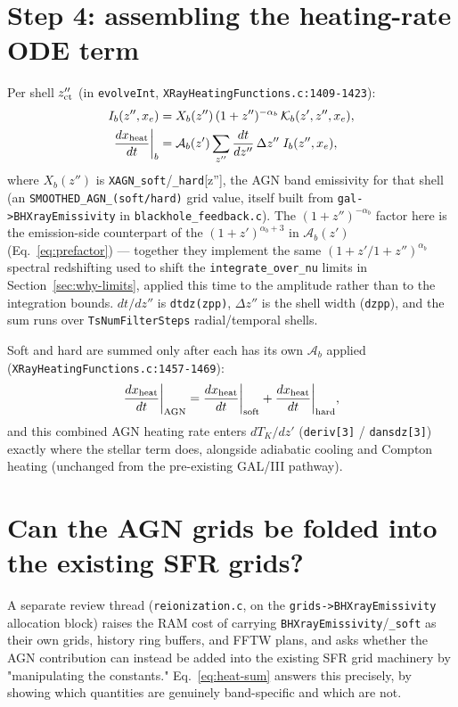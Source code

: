 \documentclass[11pt]{article}
\newcommand{\code}[1]{\texttt{#1}}
\begin{document}
\section{Step 4: assembling the heating-rate ODE term}
\label{sec:heat-sum}

Per shell $z''_{\rm ct}$ (in \code{evolveInt}, \code{XRayHeatingFunctions.c:1409-1423}):
\begin{align}
  I_b(z'',x_e) &= X_b(z'')\,(1+z'')^{-\alpha_b}\, \mathcal{K}_b(z',z'',x_e), \\
  \frac{dx_{\rm heat}}{dt}\bigg|_b &=
    \mathcal{A}_b(z') \sum_{z''} \frac{dt}{dz''}\,\Delta z''\; I_b(z'',x_e),
  \label{eq:heat-sum}
\end{align}
where $X_b(z'')$ is \code{XAGN\_soft}/\code{\_hard}[z''], the AGN band
emissivity for that shell (an \code{SMOOTHED\_AGN\_(soft/hard)} grid value,
itself built from \code{gal->BHXrayEmissivity} in \code{blackhole\_feedback.c}).
The $(1+z'')^{-\alpha_b}$ factor here is the emission-side counterpart of the
$(1+z')^{\alpha_b+3}$ in $\mathcal{A}_b(z')$ (Eq.~\eqref{eq:prefactor}) — together they implement the same
$(1+z'/1+z'')^{\alpha_b}$ spectral redshifting used to shift the
\code{integrate\_over\_nu} limits in Section~\ref{sec:why-limits}, applied
this time to the amplitude rather than to the integration bounds.
$dt/dz''$ is \code{dtdz(zpp)}, $\Delta z''$ is the shell width
(\code{dzpp}), and the sum runs over \code{TsNumFilterSteps} radial/temporal
shells.

Soft and hard are summed only after each has its own $\mathcal{A}_b$
applied (\code{XRayHeatingFunctions.c:1457-1469}):
\begin{equation}
  \frac{dx_{\rm heat}}{dt}\bigg|_{\rm AGN} =
    \frac{dx_{\rm heat}}{dt}\bigg|_{\rm soft} + \frac{dx_{\rm heat}}{dt}\bigg|_{\rm hard},
\end{equation}
and this combined AGN heating rate enters $dT_K/dz'$ (\code{deriv[3]} /
\code{dansdz[3]}) exactly where the stellar term does, alongside adiabatic
cooling and Compton heating (unchanged from the pre-existing GAL/III
pathway).

\section{Can the AGN grids be folded into the existing SFR grids?}
\label{sec:merge}

A separate review thread (\code{reionization.c}, on the
\code{grids->BHXrayEmissivity} allocation block) raises the RAM cost of
carrying \code{BHXrayEmissivity}/\code{\_soft} as their own grids, history
ring buffers, and FFTW plans, and asks whether the AGN contribution can
instead be added into the existing SFR grid machinery by "manipulating the
constants." Eq.~\eqref{eq:heat-sum} answers this precisely, by showing which
quantities are genuinely band-specific and which are not.
\end{document}
